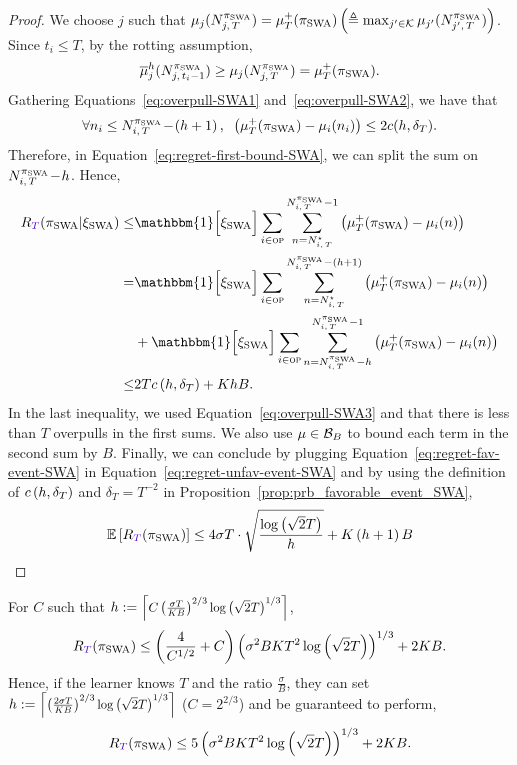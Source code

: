 \begin{proof}
We choose $j$ such that $ \mu_j(N_{j,\,T}^{\pi_{\rm SWA}}) = \mu^+_T(\pi_{\rm SWA}) \left(\triangleq \max_{j'\in \mathcal{K}} \mu_{j'}(N_{j',\,T}^{\pi_{\rm SWA}})\right)$. \\Since $t_i \leq T$, by the rotting assumption, 
\begin{equation}
\label{eq:overpull-SWA2}
 \overline{\mu}_j^h(N_{j,\,t_i -1}^{\pi_{\rm SWA}}) \geq \mu_j(N_{j,\,T}^{\pi_{\rm SWA}}) = \mu^+_T(\pi_{\rm SWA}).
\end{equation}
%
Gathering Equations~\ref{eq:overpull-SWA1} and~\ref{eq:overpull-SWA2}, we have that 
\begin{equation}
\label{eq:overpull-SWA3}
\forall n_i \leq N_{i,\,T}^{\pi_{\rm SWA}} \!-\! \left(h+1\right), \;\;   \left(\mu^+_T(\pi_{\rm SWA}) - \mu_i(n_i)\right) \leq 2c(h, \delta_T).
\end{equation}
Therefore,  in Equation~\ref{eq:regret-first-bound-SWA}, we can split the sum on $N_{i,\,T}^{\pi_{\rm SWA}} \!-\! h$. Hence, 
\begin{align}
\regret(\piSWA| \HPSWA) \leq&  \mathbbm{1} \Big[\HPSWA\Big] \sum_{i\in \overpullSet}    \sum_{n=\NiT^\star}^{\NiT^{\piSWA}-1} \pa{\mu^+_T(\piSWA) - \mu_i(n)}\nonumber\\
=&  \mathbbm{1} \Big[\HPSWA\Big] \sum_{i\in \overpullSet}    \sum_{n=\NiT^\star}^{\NiT^{\piSWA}-\pa{h+1}} \pa{\mu^+_T(\piSWA) - \mu_i(n)} \nonumber\\ 
&+ \mathbbm{1} \Big[\HPSWA\Big] \sum_{i\in \overpullSet} \sum_{n=\NiT^{\piSWA} - h }^{\NiT^{\piSWA}-1} \pa{\mu^+_T(\piSWA) - \mu_i(n)}\nonumber\\
\leq& 2Tc\pa{h,\delta_T} + KhB.
\label{eq:regret-fav-event-SWA}
\end{align}
%
In the last inequality, we used Equation~\ref{eq:overpull-SWA3} and that there is less than $T$ overpulls in the first sums. We also use $\mu \in \mathcal{B}_{B}$ to bound each term in the second sum by $B$. Finally,  we can conclude by plugging Equation~\ref{eq:regret-fav-event-SWA} in Equation~\ref{eq:regret-unfav-event-SWA} and by using the definition of $c\left(h,\delta_T\right)$ and $\delta_T= T^{-2}$ in Proposition~\ref{prop:prb_favorable_event_SWA},
\[
\EE{\regret(\piSWA)} \leq 4\sigma T\cdot\sqrt{\frac{\log\pa{\sqrt{2}T}}{h}} + K\pa{h+1}B
\]
\end{proof}
\begin{corollary}
\label{cor:SWA}
\newcommand*{\Scale}[2][4]{\scalebox{#1}{$#2$}}
For $C$ such that $h:= \ceil{\Scale[0.90]{C \pa{\frac{\sigma T}{KB}}^{2/3}\log\pa{\sqrt{2}T}^{1/3}}}$,
\[
\regret(\piSWA) \leq \pa{\frac{4}{C^{1/2}} + C} \pa{\sigma^2 B K T^2 \log\pa{\sqrt{2}T}}^{1/3} + 2KB. 
\]
%
Hence, if the learner knows $T$ and the ratio $\frac{\sigma}{B}$, they can set $h:= \ceil{\Scale[0.90]{\pa{\frac{2\sigma T}{KB}}^{2/3}\log\pa{\sqrt{2}T}^{1/3}}}$ (\ie $C=2^{2/3}$) and be guaranteed to perform,
\[
\regret(\piSWA) \leq 5 \pa{\sigma^2 B K T^2 \log\pa{\sqrt{2}T}}^{1/3} + 2KB. 
\]
%
\end{corollary}

